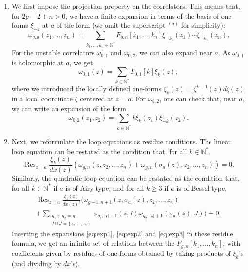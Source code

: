 \documentclass[reqno,oneside,11pt]{amsart}
\theoremstyle{plain}
\theoremstyle{definition}
\theoremstyle{remark}
\numberwithin{equation}{section}
\DeclareMathOperator*{\Res}{Res}
\newcommand{\I}{\mathcal{I}}
\begin{document}
\begin{enumerate}
\item We first impose the projection property on the correlators. This means that, for $2g-2+n>0$, we have a finite expansion in terms of the basis of one-forms $\xi_{-k}$ at $a$ of the form (we omit the superscript $^{(a)}$ for simplicity):
\begin{equation}\label{eq:exp1}
\omega_{g,n}(z_1,\ldots,z_n) = \sum_{k_1,\ldots,k_n \in \mathbb{N}^*} F_{g,n}[k_1,\ldots,k_n]  \xi_{-k_1}(z_1) \cdots  \xi_{-k_n}(z_n).
\end{equation}
For the unstable correlators $\omega_{0,1}$ and $\omega_{0,2}$, we can also expand near $a$. As $\omega_{0,1}$ is holomorphic at $a$, we get
\begin{equation}\label{eq:exp2}
\omega_{0,1}(z) = \sum_{k \in \mathbb{N}^*} F_{0,1}[k]  \xi_k(z),
\end{equation}
where we introduced the locally defined one-forms $\xi_k(z) = \zeta^{k-1}(z) d \zeta(z)$ in a local coordinate $\zeta$ centered at $z=a$.
For $\omega_{0,2}$, one can check that, near $a$, we can write an expansion of the form
\begin{equation}\label{eq:exp3}
\omega_{0,2}(z_1,z_2) = \sum_{k \in \mathbb{N}^*} k  \xi_k(z_1)  \xi_{-k}(z_2).
\end{equation}
\item Next, we reformulate the loop equations as residue conditions. The linear loop equation can be restated as the condition that, for all $k \in \mathbb{N}^*$,
\begin{equation} 
\Res_{z=a} \frac{ \xi_k(z)}{dx(z)} \left( \omega_{g,n}(z, z_2, \ldots, z_n) + \omega_{g,n}(\sigma_a(z), z_2, \ldots, z_n) \right)= 0.
\end{equation}
Similarly, the quadratic loop equation can be restated as the condition that, for all $k \in \mathbb{N}^*$ if $a$ is of Airy-type, and for all $k \geq 3$ if $a$ is of Bessel-type,
\begin{gather}
\Res_{z=a} \frac{ \xi_k(z)}{dx(z)^2}  \Big(\omega_{g-1,n+1}(z, \sigma_a(z), z_2, \ldots, z_n) \\+ \sum_{\substack{g_1+g_2=g\\I\cup J = \{ z_2, \ldots, z_n \}}} \omega_{g_1, |I|+1}(z, I) \omega_{g_2,|J|+1}(\sigma_a(z), J) \Big)= 0.
\end{gather}
Inserting the expansions  \eqref{eq:exp1}, \eqref{eq:exp2} and \eqref{eq:exp3} in these residue formula, we get an infinite set of relations between the $F_{g,n}[k_1,\ldots,k_n]$, with coefficients given by residues of one-forms obtained by taking products of $\xi_k$'s (and dividing by $dx$'s).

\end{enumerate}
\end{document}
